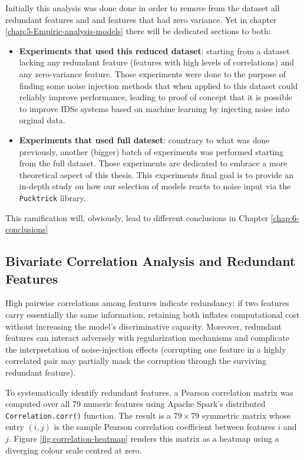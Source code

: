 \documentclass[../main.tex]{subfiles}
\begin{document}
Initially this analysis was done done in order to remove from the dataset all redundant features and and features that had zero variance. Yet in chapter \ref{chap:5-Empiric-analysis-models} there will be dedicated sections to both:
\begin{itemize}
    \item {} \textbf{Experiments that used this reduced dataset}: starting from a dataset lacking any redundant feature (features with high levels of correlations) and any zero-variance feature. Those experiments were done to the purpose of finding some noise injection methods that when applied to this dataset could reliably improve performance, leading to proof of concept that it is possible to improve IDSs systems based on machine learning by injecting noise into orginal data. 
    \item {} \textbf{Experiments that used full dateset}: countrary to what was done previously, another (bigger) batch of experiments was performed starting from the full dataset. Those experiments are dedicated to embrace a more theoretical aspect of this thesis. This experiments final goal is to provide an in-depth study on how our selection of models reacts to noise input via the \texttt{Pucktrick} library.
\end{itemize}

This ramification will, obviously, lead to different conclusions in Chapter \ref{chap:6-conclusions}

\subsection{Bivariate Correlation Analysis and Redundant Features}
\label{sec:corr-analysis}

High pairwise correlations among features indicate redundancy: if two features carry essentially the same information, retaining both inflates computational cost without increasing the model's discriminative capacity.  Moreover, redundant features can interact adversely with regularization mechanisms and complicate the interpretation of noise-injection effects (corrupting one feature in a highly correlated pair may partially mask the corruption through the surviving redundant feature).

To systematically identify redundant features, a Pearson correlation matrix was computed over all 79 numeric features using Apache Spark's distributed \texttt{Correlation.corr()} function.  The result is a $79 \times 79$ symmetric matrix whose entry $(i,j)$ is the sample Pearson correlation coefficient between features $i$ and $j$.  Figure \ref{fig:correlation-heatmap} renders this matrix
as a heatmap using a diverging colour scale centred at zero.
\end{document}
